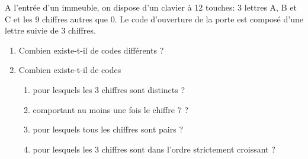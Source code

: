 \documentclass[a4paper, 11pt]{article}
\begin{document}
\begin{exercice}  \;
	A l'entr\'ee d'un immeuble, on dispose d'un clavier \`a 12 touches: 3 lettres A, B et C et les 9 chiffres autres que 0. Le code d'ouverture de la porte est compos\'e d'une lettre suivie de 3 chiffres.
	\begin{enumerate}
		\item Combien existe-t-il de codes diff\'erents ?
		\item Combien existe-t-il de codes
		      \begin{enumerate}
			      \item pour lesquels les 3 chiffres sont distincts ?
			      \item comportant au moins une fois le chiffre 7 ?
			      \item pour lesquels tous les chiffres sont pairs ?
			      \item   \; pour lesquels les 3 chiffres sont dans l'ordre strictement croissant ?
		      \end{enumerate}
	\end{enumerate}
\end{exercice}
\end{document}
